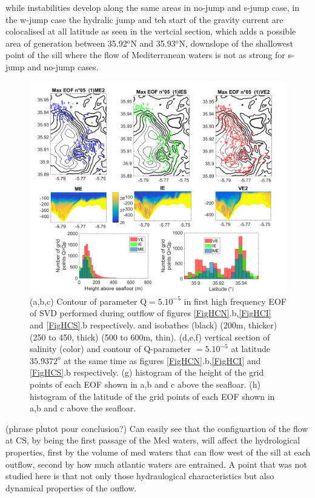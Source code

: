 while instabilities develop along the same areas in no-jump and s-jump case, in the w-jump case the hydralic jump and teh start of the gravity current are colocalised at all latitude as seen in the vertcial section, which adds a possible area of generation between 35.92$^\text{o}$N and 35.93$^\text{o}$N, downslope of the shallowest point of the sill where the flow of Mediterranean waters is not as strong for s-jump and no-jump cases.


\begin{figure}[!h]
 \includegraphics[width=\textwidth]{./GBR3D/EOF5_MIV_2D.png}
 \caption {(a,b,c) Contour of parameter Q$=5.10^{-5}$ in first high frequency EOF of SVD performed during outflow of figures \ref{FigHCN}.b,\ref{FigHCI} and \ref{FigHCS}.b respectively. and isobathes (black) (200m, thicker)  (250 to 450, thick) (500 to 600m, thin). (d,e,f) vertical section of salinity (color) and contour of Q-parameter $=5.10^{-5}$ at latitude $35.9372^\text{o}$ at the same time as figures \ref{FigHCN}.b,\ref{FigHCI} and \ref{FigHCS}.b respectively. (g) histogram of the height of the grid points of each EOF shown in a,b and c above the seafloar. (h) histogram of the latitude of the grid points of each EOF shown in a,b and c above the seafloar. }
 \label{FigEOFMIV}
\end{figure}


(phrase plutot pour conclusion?) Can easily see that the configuartion of the flow at CS, by being the first passage of the Med waters, will affect the hydrological properties, first by the volume of med waters that can flow west of the sill at each outflow, second by how much atlantic waters are entrained. A point that was not studied here is that not only those hydraulogical characteristics but also dynamical properties of the ouflow.


